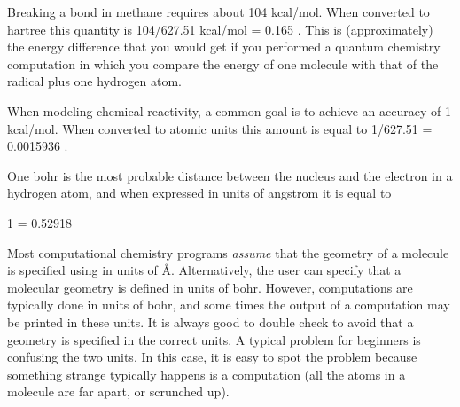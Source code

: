 \documentclass[../Main/chem371-notes.tex]{subfiles}
\begin{document}
\begin{example}
Breaking a  bond in methane requires about 104 kcal/mol. When converted to hartree this quantity is 104/627.51 kcal/mol = 0.165 \Eh.
This is (approximately) the energy difference that you would get if you performed a quantum chemistry computation in which you compare the energy of one  molecule with that of the  radical plus one hydrogen atom.
\end{example}

\begin{example}
When modeling chemical reactivity, a common goal is to achieve an accuracy of 1 kcal/mol. When converted to atomic units this amount is equal to 1/627.51 \Eh = 0.0015936 \Eh.
\end{example}

One bohr is the most probable distance between the nucleus and the electron in a hydrogen atom, and when expressed in units of angstrom it is equal to
\begin{iequation}
1  = 0.52918 \text{ \AA{}}
\end{iequation}
Most computational chemistry programs \emph{assume} that the geometry of a molecule is specified using in units of \AA{}.
Alternatively, the user can specify that a molecular geometry is defined in units of bohr.
However, computations are typically done in units of bohr, and some times the output of a computation may be printed in these units.
It is always good to double check to avoid that a geometry is specified in the correct units.
A typical problem for beginners is confusing the two units.
In this case, it is easy to spot the problem because something strange typically happens is a computation (all the atoms in a molecule are far apart, or scrunched up).
\end{document}
